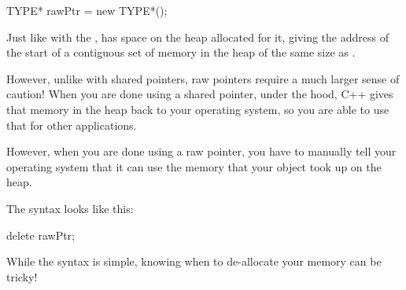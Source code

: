 \documentclass{tufte-handout}
\begin{document}
\begin{Code}
    TYPE* rawPtr = new TYPE*();
\end{Code}
Just like with the ,  has space on the heap allocated for it, giving  the address of the start of a contiguous set of memory in the heap of the same size as .


However, unlike with shared pointers, raw pointers require a much larger sense of caution!
When you are done using a shared pointer, under the hood, C++ gives that memory in the heap back to your operating system, so you are able to use that for other applications. 

However, when you are done using a raw pointer, you have to manually tell your operating system that it can use the memory that your object took up on the heap.

The syntax looks like this:

\begin{Code}
    delete rawPtr;
\end{Code}


While the syntax is simple, knowing when to de-allocate your memory can be tricky!

\end{document}
